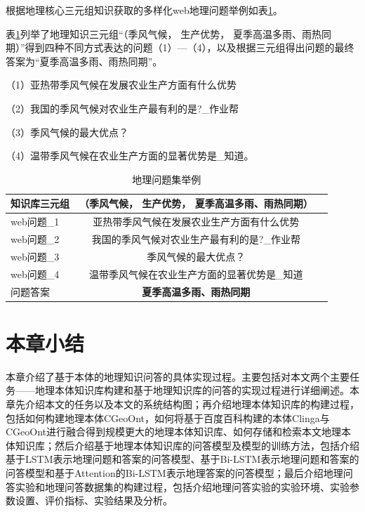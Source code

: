 根据地理核心三元组知识获取的多样化web地理问题举例如表\ref{tab:qa_dataset}。

表\ref{tab:qa_dataset}列举了地理知识三元组“（季风气候， 生产优势， 夏季高温多雨、雨热同期）”得到四种不同方式表达的问题（1）—（4），以及根据三元组得出问题的最终答案为“夏季高温多雨、雨热同期”。

（1）亚热带季风气候在发展农业生产方面有什么优势

（2）我国的季风气候对农业生产最有利的是?\_作业帮

（3）季风气候的最大优点？

（4）温带季风气候在农业生产方面的显著优势是\_知道。

\begin{table}[htbp] 
	\centering
	\caption{\label{tab:qa_dataset}地理问题集举例} 
	\begin{tabular}{lcl}
		\toprule 
		知识库三元组	& \textbf{（季风气候， 生产优势， 夏季高温多雨、雨热同期）}\\
		\midrule 
		web问题\_1 & 亚热带季风气候在发展农业生产方面有什么优势 \\ 
		web问题\_2 & 我国的季风气候对农业生产最有利的是?\_作业帮 \\ 
		web问题\_3 & 季风气候的最大优点？ \\
		web问题\_4 & 温带季风气候在农业生产方面的显著优势是\_知道 \\
		\midrule
		问题答案 & \textbf{夏季高温多雨、雨热同期}\\ 
		\bottomrule 
	\end{tabular} 
\end{table}



\section{本章小结}
本章介绍了基于本体的地理知识问答的具体实现过程。主要包括对本文两个主要任务——地理本体知识库构建和基于地理知识库的问答的实现过程进行详细阐述。本章先介绍本文的任务以及本文的系统结构图；再介绍地理本体知识库的构建过程，包括如何构建地理本体CGeoOnt，如何将基于百度百科构建的本体Clinga与CGeoOnt进行融合得到规模更大的地理本体知识库、如何存储和检索本文地理本体知识库；然后介绍基于地理本体知识库的问答模型及模型的训练方法，包括介绍基于LSTM表示地理问题和答案的问答模型、基于Bi-LSTM表示地理问题和答案的问答模型和基于Attention的Bi-LSTM表示地理答案的问答模型；最后介绍地理问答实验和地理问答数据集的构建过程，包括介绍地理问答实验的实验环境、实验参数设置、评价指标、实验结果及分析。

